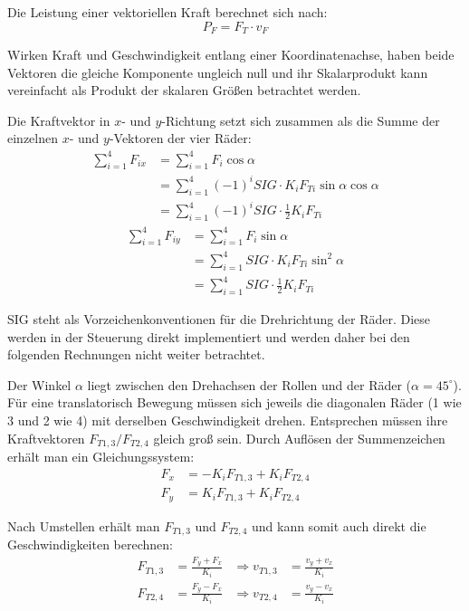Die Leistung einer vektoriellen Kraft berechnet sich nach:
$$ P_F = F_T \cdot v_F $$

Wirken Kraft und Geschwindigkeit entlang einer Koordinatenachse, haben beide Vektoren die gleiche Komponente ungleich null und ihr Skalarprodukt kann vereinfacht als Produkt der skalaren Größen betrachtet werden.

Die Kraftvektor in $x$- und $y$-Richtung setzt sich zusammen als die Summe der einzelnen $x$- und $y$-Vektoren der vier Räder:
\begin{align*}
    \sum_{i=1}^4 F_{ix} &= \sum_{i=1}^4 F_i \cos \alpha                 \\
    &= \sum_{i=1}^4 (-1)^i SIG \cdot K_i F_{Ti} \sin \alpha \cos \alpha \\
    &= \sum_{i=1}^4 (-1)^i SIG \cdot \frac{1}{2} K_i F_{Ti}
\end{align*}
\begin{align*}
    \sum_{i=1}^4 F_{iy} &= \sum_{i=1}^4 F_i \sin \alpha                 \\
    &= \sum_{i=1}^4 SIG \cdot K_i F_{Ti} \sin^2 \alpha                  \\
    &= \sum_{i=1}^4 SIG \cdot \frac{1}{2} K_i F_{Ti}
\end{align*}

SIG steht als Vorzeichenkonventionen für die Drehrichtung der Räder. Diese werden in der Steuerung direkt implementiert und werden daher bei den folgenden Rechnungen nicht weiter betrachtet.

Der Winkel $ \alpha $ liegt zwischen den Drehachsen der Rollen und der Räder ($\alpha = 45^\circ$).
Für eine translatorisch Bewegung müssen sich jeweils die diagonalen Räder (1 wie 3 und 2 wie 4) mit derselben Geschwindigkeit drehen. Entsprechen müssen ihre Kraftvektoren $F_{T1, 3} / F_{T2, 4}$ gleich groß sein.
Durch Auflösen der Summenzeichen erhält man ein Gleichungssystem:
\begin{align*}
    F_x &= - K_i F_{T1, 3} + K_i F_{T2, 4} \\
    F_y &= K_i F_{T1, 3}   + K_i F_{T2, 4}
\end{align*}

Nach Umstellen erhält man $F_{T1, 3}$ und $F_{T2, 4}$ und kann somit auch direkt die Geschwindigkeiten berechnen:
\begin{align*}
    F_{T1, 3} &= \frac{F_y + F_x}{K_i} &\Rightarrow v_{T1, 3} &= \frac{v_y + v_x}{K_i} \\
    F_{T2, 4} &= \frac{F_y - F_x}{K_i} &\Rightarrow v_{T2, 4} &= \frac{v_y - v_x}{K_i} \\
\end{align*}

